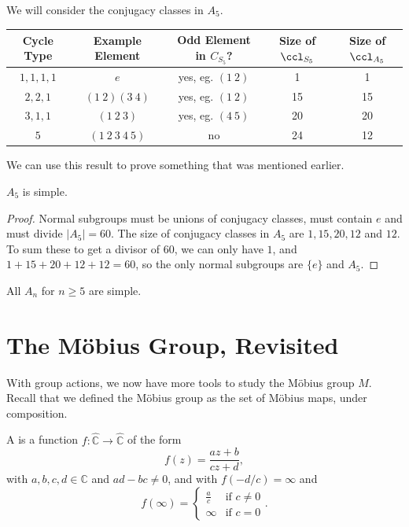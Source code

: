 \documentclass[a4paper]{scrartcl}
\begin{document}
\begin{example}
	We will consider the conjugacy classes in $A_5$. 
	\begin{center}
		\begin{tabular}{@{}ccccc@{}}
		\toprule
		Cycle Type & Example Element & Odd Element in $C_{S_5}$? & Size of $\ccl_{S_5}$ & Size of $\ccl_{A_5}$ \\ \midrule
		$1, 1, 1, 1$ & $e$ & yes, eg. $(1\ 2)$ & 1 & 1\\
		$2, 2, 1$ & $(1\ 2)(3\ 4)$ & yes, eg. $(1\ 2)$ & 15 & 15 \\
		$3, 1, 1$ & $(1\ 2\ 3)$ & yes, eg. $(4\ 5)$ & 20 & 20\\
		$5$ & $(1\ 2\ 3\ 4\ 5)$ & no & 24 & 12\\
		\bottomrule
		\end{tabular}
	\end{center}
\end{example}

We can use this result to prove something that was mentioned earlier.

\begin{theorem}
	$A_5$ is simple.
\end{theorem}
\begin{proof}
	Normal subgroups must be unions of conjugacy classes, must contain $e$ and must divide $|A_5| = 60$. The size of conjugacy classes in $A_5$ are $1, 15, 20 ,12$ and $12$. To sum these to get a divisor of 60, we can only have $1$, and $1 + 15 + 20 + 12 + 12 = 60$, so the only normal subgroups are $\{e\}$ and $A_5$.
\end{proof}

\begin{remark}
	All $A_n$ for $n \geq 5$ are simple.
\end{remark}


\section{The Möbius Group, Revisited}

With group actions, we now have more tools to study the Möbius group $M$. Recall that we defined the Möbius group as the set of Möbius maps, under composition. 
\begin{definition*}
	A  is a function $f : \hat{\mathbb{C}} \rightarrow \hat{\mathbb{C}}$ of the form
	$$
	f(z) = \frac{az + b}{cz + d},
	$$
	with $a, b, c, d \in \mathbb{C}$ and $ad - bc \neq 0$, and with $f(-d/c) = \infty$ and 
	$$
	f(\infty) = \begin{cases}
	   \frac{a}{c} &\mbox{if } c \neq 0 \\
	   \infty &\mbox{if } c = 0
	   \end{cases}.
	$$
\end{definition*}
\end{document}
